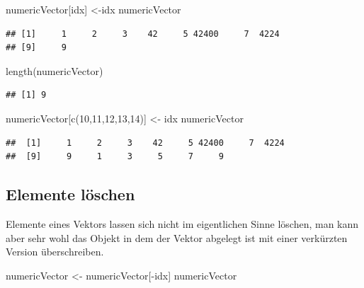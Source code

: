 \documentclass[
]{book}
\newenvironment{Shaded}{\begin{snugshade}}{\end{snugshade}}
\newcommand{\DecValTok}[1]{\textcolor[rgb]{0.00,0.00,0.81}{#1}}
\newcommand{\FunctionTok}[1]{\textcolor[rgb]{0.00,0.00,0.00}{#1}}
\newcommand{\NormalTok}[1]{#1}
\newcommand{\OtherTok}[1]{\textcolor[rgb]{0.56,0.35,0.01}{#1}}
\newcommand{\SpecialCharTok}[1]{\textcolor[rgb]{0.00,0.00,0.00}{#1}}
\begin{document}
\begin{Shaded}
\begin{Highlighting}[]
\NormalTok{numericVector[idx] }\OtherTok{\textless{}{-}}\NormalTok{idx}
\NormalTok{numericVector}
\end{Highlighting}
\end{Shaded}

\begin{verbatim}
## [1]     1     2     3    42     5 42400     7  4224
## [9]     9
\end{verbatim}

\begin{Shaded}
\begin{Highlighting}[]
\FunctionTok{length}\NormalTok{(numericVector)}
\end{Highlighting}
\end{Shaded}

\begin{verbatim}
## [1] 9
\end{verbatim}

\begin{Shaded}
\begin{Highlighting}[]
\NormalTok{numericVector[}\FunctionTok{c}\NormalTok{(}\DecValTok{10}\NormalTok{,}\DecValTok{11}\NormalTok{,}\DecValTok{12}\NormalTok{,}\DecValTok{13}\NormalTok{,}\DecValTok{14}\NormalTok{)] }\OtherTok{\textless{}{-}}\NormalTok{ idx}
\NormalTok{numericVector}
\end{Highlighting}
\end{Shaded}

\begin{verbatim}
##  [1]     1     2     3    42     5 42400     7  4224
##  [9]     9     1     3     5     7     9
\end{verbatim}

\hypertarget{elemente-luxf6schen}{%
\subsection{Elemente löschen}\label{elemente-luxf6schen}}

Elemente eines Vektors lassen sich nicht im eigentlichen Sinne löschen, man kann aber sehr wohl das Objekt in dem der Vektor abgelegt ist mit einer verkürzten Version überschreiben.

\begin{Shaded}
\begin{Highlighting}[]
\NormalTok{numericVector }\OtherTok{\textless{}{-}}\NormalTok{ numericVector[}\SpecialCharTok{{-}}\NormalTok{idx]}
\NormalTok{numericVector}
\end{Highlighting}
\end{Shaded}
\end{document}
